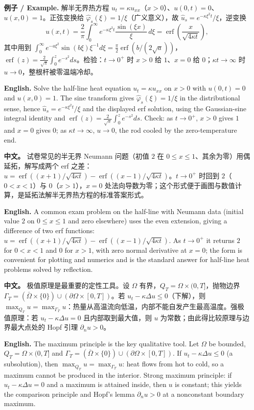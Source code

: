\documentclass[UTF8,11pt,a4paper]{ctexart}
\newcommand{\EN}[1]{\par\noindent \textbf{English.} #1\par}
\newcommand{\EX}[2]{\par\noindent \textbf{例子 / Example.} #1\par\EN{#2}}
\newcommand{\APS}[2]{\par\noindent\textbf{中文。} #1\par\noindent\textbf{English.} #2\par\smallskip}
\begin{document}
\EX{解半无界热方程 $u_t=\kappa u_{xx}$（$x>0$）、$u(0,t)=0$、$u(x,0)=1$。正弦变换给 $\widehat\varphi_s(\xi)=1/\xi$（广义意义），故 $\widehat u_s=e^{-\kappa\xi^2t}/\xi$，逆变换
\[
u(x,t)=\frac2\pi\int_0^\infty e^{-\kappa\xi^2t}\frac{\sin(\xi x)}{\xi}\,d\xi
=\operatorname{erf}\!\left(\frac{x}{\sqrt{4\kappa t}}\right),
\]
其中用到 $\int_0^\infty e^{-a\xi^2}\sin(b\xi)\xi^{-1}d\xi=\frac\pi2\operatorname{erf}(b/(2\sqrt a))$，$\operatorname{erf}(z)=\frac2{\sqrt\pi}\int_0^ze^{-s^2}ds$。检验：$t\to0^+$ 时 $x>0$ 给 $1$、$x=0$ 给 $0$；$\kappa t\to\infty$ 时 $u\to0$，整根杆被零温端冷却。}{Solve the half-line heat equation $u_t=\kappa u_{xx}$ on $x>0$ with $u(0,t)=0$ and $u(x,0)=1$. The sine transform gives $\widehat\varphi_s(\xi)=1/\xi$ in the distributional sense, hence $\widehat u_s=e^{-\kappa\xi^2t}/\xi$ and the displayed erf solution, using the Gaussian-sine integral identity and $\operatorname{erf}(z)=\frac2{\sqrt\pi}\int_0^ze^{-s^2}ds$. Check: as $t\to0^+$, $x>0$ gives $1$ and $x=0$ gives $0$; as $\kappa t\to\infty$, $u\to0$, the rod cooled by the zero-temperature end.}
\APS{试卷常见的半无界 Neumann 问题（初值 $2$ 在 $0\le x\le1$、其余为零）用偶延拓，解写成两个 erf 之差：$u=\operatorname{erf}((x+1)/\sqrt{4\kappa t})-\operatorname{erf}((x-1)/\sqrt{4\kappa t})$。$t\to0^+$ 时回到 $2$（$0<x<1$）与 $0$（$x>1$），$x=0$ 处法向导数为零；这个形式便于画图与数值计算，是延拓法解半无界热方程的标准答案形式。}{A common exam problem on the half-line with Neumann data (initial value $2$ on $0\le x\le1$ and zero elsewhere) uses the even extension, giving a difference of two erf functions: $u=\operatorname{erf}((x+1)/\sqrt{4\kappa t})-\operatorname{erf}((x-1)/\sqrt{4\kappa t})$. As $t\to0^+$ it returns $2$ for $0<x<1$ and $0$ for $x>1$, with zero normal derivative at $x=0$; the form is convenient for plotting and numerics and is the standard answer for half-line heat problems solved by reflection.}
\APS{极值原理是最重要的定性工具。设 $\Omega$ 有界，$Q_T=\Omega\times(0,T]$，抛物边界 $\Gamma_T=(\bar\Omega\times\{0\})\cup(\partial\Omega\times[0,T])$。若 $u_t-\kappa\Delta u\le0$（下解），则 $\max_{Q_T}u=\max_{\Gamma_T}u$：热量从高温流向低温，内部不能自发产生最高温度。强极值原理：若 $u_t-\kappa\Delta u=0$ 且内部取到最大值，则 $u$ 为常数；由此得比较原理与边界最大点处的 Hopf 引理 $\partial_nu>0$。}{The maximum principle is the key qualitative tool. Let $\Omega$ be bounded, $Q_T=\Omega\times(0,T]$ and $\Gamma_T=(\bar\Omega\times\{0\})\cup(\partial\Omega\times[0,T])$. If $u_t-\kappa\Delta u\le0$ (a subsolution), then $\max_{Q_T}u=\max_{\Gamma_T}u$: heat flows from hot to cold, so a maximum cannot be produced in the interior. Strong maximum principle: if $u_t-\kappa\Delta u=0$ and a maximum is attained inside, then $u$ is constant; this yields the comparison principle and Hopf's lemma $\partial_nu>0$ at a nonconstant boundary maximum.}
\end{document}
